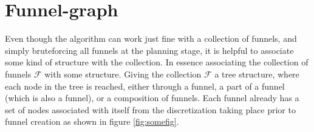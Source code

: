 \section{Funnel-graph}

Even though the \rrtfunnel{} algorithm can work just fine with a collection of
funnels, and simply bruteforcing all funnels at the planning stage, it is
helpful to associate some kind of structure with the collection. In essence
associating the collection of funnels \(\mathcal{F}\) with some structure.
Giving the collection \(\mathcal{F}\) a tree structure, where each node in the
tree is reached, either through a funnel, a part of a funnel (which is also a
funnel), or a composition of funnels. Each funnel already has a set of nodes
associated with itself from the discretization taking place prior to funnel
creation as shown in figure \ref{fig:somefig}.

